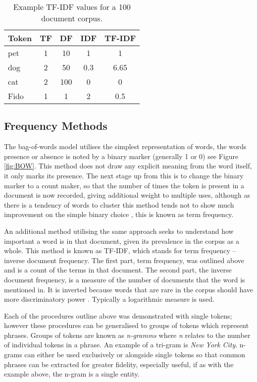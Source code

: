 \begin{table}[]
\centering
\begin{tabular}{@{}lcccc@{}}
\toprule
\textbf{Token} & \multicolumn{1}{l}{\textbf{TF}} & \multicolumn{1}{l}{\textbf{DF}} & \multicolumn{1}{l}{\textbf{IDF}} & \multicolumn{1}{l}{\textbf{TF-IDF}} \\ \midrule
pet  & 1 & 10  & 1   & 1    \\
dog  & 2 & 50  & 0.3 & 6.65 \\
cat  & 2 & 100 & 0   & 0    \\
Fido & 1 & 1   & 2   & 0.5  \\ \bottomrule
\end{tabular}
\caption{\label{tab:search} Example TF-IDF values for a 100 document corpus.}
\end{table}

\subsection{Frequency Methods}

The bag-of-words model utilises the simplest representation of words, the words presence or absence is noted by a binary marker (generally 1 or 0) see Figure \ref{fig:BOW}. This method does not draw any explicit meaning from the word itself, it only marks its presence. The next stage up from this is to change the binary marker to a count maker, so that the number of times the token is present in a document is now recorded, giving additional weight to multiple uses, although as there is a tendency of words to cluster this method tends not to show much improvement on the simple binary choice \parencite{eisenstein2018natural}, this is known as term frequency. 

An additional method utilising the same approach seeks to understand how important a word is in that document, given its prevalence in the corpus as a whole. This method is known as TF-IDF, which stands for term frequency – inverse document frequency. The first part, term frequency, was outlined above and is a count of the terms in that document. The second part, the inverse document frequency, is a measure of the number of documents that the word is mentioned in. It is inverted because words that are rare in the corpus should have more discriminatory power  \parencite{manning2008introduction}. Typically a logarithmic measure is used. 

Each of the procedures outline above was demonstrated with single tokens; however these procedures can be generalised to groups of tokens which represent phrases. Groups of tokens are known as \emph{n-gramms} where  \emph{n} relates to the number of individual tokens in a phrase. An example of a tri-gram is \emph{New York City}. n-grams can either be used exclusively or alongside single tokens so that common phrases can be extracted for greater fidelity, especially useful, if as with the example above, the n-gram is a single entity. 

